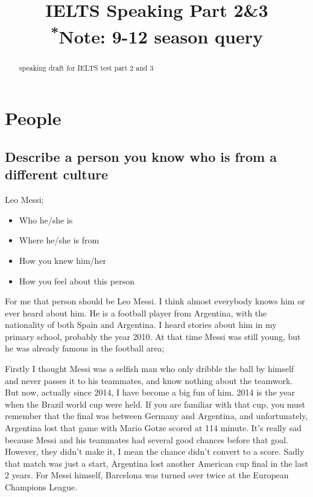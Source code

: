 \documentclass[conference]{IEEEtran}
\begin{document}
\title{IELTS Speaking Part 2\&3\\
{\footnotesize \textsuperscript{*}Note: 9-12 season query}}

\author{}

\maketitle

\begin{abstract}
speaking draft for IELTS test part 2 and 3
\end{abstract}

\section{People}
\subsection{Describe a person you know who is from a different culture}
Leo Messi;
    \begin{itemize}
        \item Who he/she is
        \item Where he/she is from
        \item How you knew him/her
        \item How you feel about this person
    \end{itemize}

For me that person should be Leo Messi. I think almost everybody knows him or ever heard about him.
He is a football player from Argentina, with the nationality of both Spain and Argentina.
I heard stories about him in my primary school, probably the year 2010.
At that time Messi was still young, but he was already famous in the football area;

Firstly I thought Messi was a selfish man who only dribble the ball by himself and never passes it to his teammates,
and know nothing about the teamwork. But now, actually since 2014, I have become a big fun of him.
2014 is the year when the Brazil world cup were held.
If you are familiar with that cup, you must remember that the final was between Germany and Argentina,
and unfortunately, Argentina lost that game with Mario Gotze scored at 114 minute.
It's really sad because Messi and his teammates had several good chances before that goal.
However, they didn't make it, I mean the chance didn't convert to a score.
Sadly that match was just a start, Argentina lost another American cup final in the last 2 years.
For Messi himself, Barcelona was turned over twice at the European Champions League.
\end{document}
